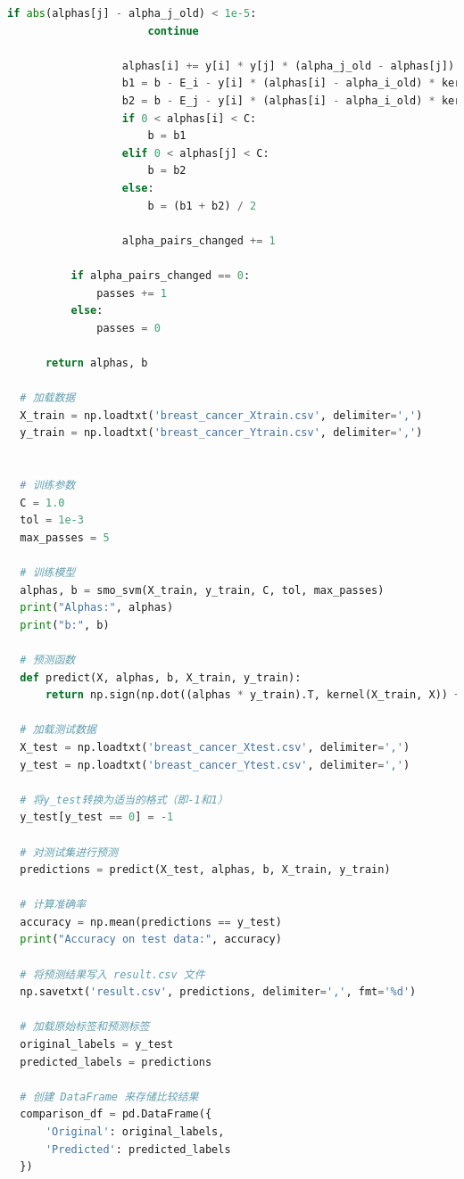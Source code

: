 \documentclass[12pt]{article}
\begin{document}
\begin{lstlisting}[language=Python]
                  if abs(alphas[j] - alpha_j_old) < 1e-5:
                      continue
  
                  alphas[i] += y[i] * y[j] * (alpha_j_old - alphas[j])
                  b1 = b - E_i - y[i] * (alphas[i] - alpha_i_old) * kernel(X[i], X[i]) - y[j] * (alphas[j] - alpha_j_old) * kernel(X[i], X[j])
                  b2 = b - E_j - y[i] * (alphas[i] - alpha_i_old) * kernel(X[i], X[j]) - y[j] * (alphas[j] - alpha_j_old) * kernel(X[j], X[j])
                  if 0 < alphas[i] < C:
                      b = b1
                  elif 0 < alphas[j] < C:
                      b = b2
                  else:
                      b = (b1 + b2) / 2
  
                  alpha_pairs_changed += 1
  
          if alpha_pairs_changed == 0:
              passes += 1
          else:
              passes = 0
  
      return alphas, b
  
  # 加载数据
  X_train = np.loadtxt('breast_cancer_Xtrain.csv', delimiter=',')
  y_train = np.loadtxt('breast_cancer_Ytrain.csv', delimiter=',')
  
  
  # 训练参数
  C = 1.0
  tol = 1e-3
  max_passes = 5
  
  # 训练模型
  alphas, b = smo_svm(X_train, y_train, C, tol, max_passes)
  print("Alphas:", alphas)
  print("b:", b)
  
  # 预测函数
  def predict(X, alphas, b, X_train, y_train):
      return np.sign(np.dot((alphas * y_train).T, kernel(X_train, X)) + b)
  
  # 加载测试数据
  X_test = np.loadtxt('breast_cancer_Xtest.csv', delimiter=',')
  y_test = np.loadtxt('breast_cancer_Ytest.csv', delimiter=',')
  
  # 将y_test转换为适当的格式（即-1和1）
  y_test[y_test == 0] = -1
  
  # 对测试集进行预测
  predictions = predict(X_test, alphas, b, X_train, y_train)
  
  # 计算准确率
  accuracy = np.mean(predictions == y_test)
  print("Accuracy on test data:", accuracy)
  
  # 将预测结果写入 result.csv 文件
  np.savetxt('result.csv', predictions, delimiter=',', fmt='%d')
  
  # 加载原始标签和预测标签
  original_labels = y_test
  predicted_labels = predictions
  
  # 创建 DataFrame 来存储比较结果
  comparison_df = pd.DataFrame({
      'Original': original_labels,
      'Predicted': predicted_labels
  })
  

\end{lstlisting}
\end{document}
